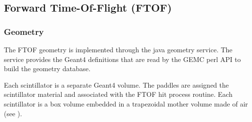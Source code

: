 \subsection{Forward Time-Of-Flight (FTOF)}

\subsubsection{Geometry}

The FTOF geometry is implemented through the java geometry service.
The service provides the Geant4 definitions that are read by the GEMC perl API to build the geometry database.

Each scintillator is a separate Geant4 volume. The paddles are assigned the scintillator material and
associated with the FTOF hit process routine.
Each scintillator is a box volume embedded in a trapezoidal mother volume made of air (see ).


